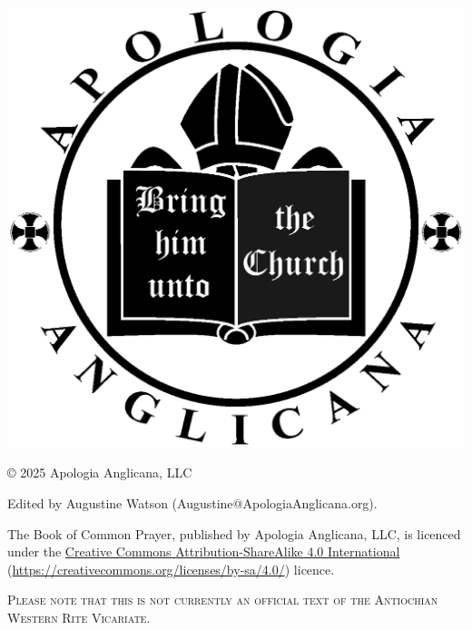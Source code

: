 \documentclass[10pt]{book}
\begin{document}
\begin{titlepage}
\begin{center}
   	        \includegraphics[scale=.17]{logo.eps}
		\end{center}
	\end{titlepage}
\cleardoublepage
{}
\tableofcontents
{}%
\clearpage
\setcounter{page}{1}
\frontmatter
{}
{}
\noindent
\copyright{} 2025 Apologia Anglicana, LLC\\
\par\noindent
Edited by Augustine Watson (Augustine@ApologiaAnglicana.org).\\%
\par\noindent
The Book of Common Prayer, published by Apologia Anglicana, LLC, is licenced under the \href{https://creativecommons.org/licenses/by-sa/4.0/}{Creative Commons Attribution-ShareAlike 4.0 International} (\url{https://creativecommons.org/licenses/by-sa/4.0/}) licence.
\begin{center}
	\textsc{Please note that this is not currently an official text of the Antiochian Western Rite Vicariate.}
\end{center}
\end{document}

